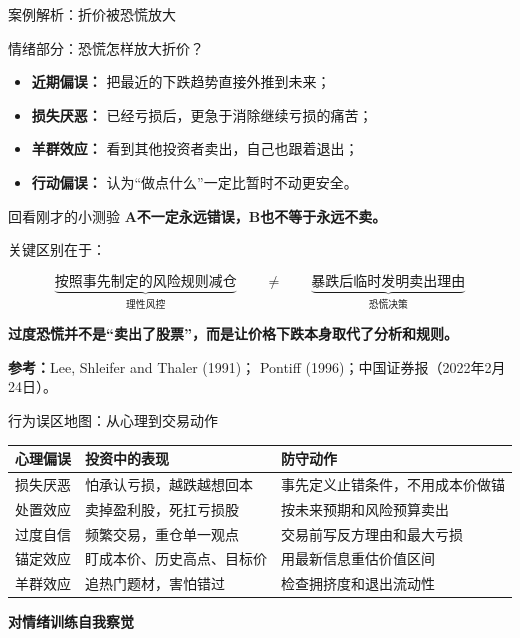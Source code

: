 \documentclass[UTF8,aspectratio=169,11pt]{ctexbeamer}
\newcommand{\source}[1]{\vfill{\scriptsize\color{aqgray}\textbf{参考：}#1}}
\begin{document}
\begin{frame}{案例解析：折价被恐慌放大}
\scriptsize



\begin{riskbox}{情绪部分：恐慌怎样放大折价？}
\begin{itemize}
\item \textbf{近期偏误：}
      把最近的下跌趋势直接外推到未来；
\item \textbf{损失厌恶：}
      已经亏损后，更急于消除继续亏损的痛苦；
\item \textbf{羊群效应：}
      看到其他投资者卖出，自己也跟着退出；
\item \textbf{行动偏误：}
      认为“做点什么”一定比暂时不动更安全。
\end{itemize}
\end{riskbox}


\vspace{0.10cm}

\begin{greenbox}{回看刚才的小测验}
\centering
\textbf{A不一定永远错误，B也不等于永远不卖。}

\vspace{0.05cm}

关键区别在于：

\[
\underbrace{\text{按照事先制定的风险规则减仓}}_{\text{理性风控}}
\qquad\neq\qquad
\underbrace{\text{暴跌后临时发明卖出理由}}_{\text{恐慌决策}}
\]
\end{greenbox}

\vspace{0.08cm}

\begin{center}
\large
\textbf{过度恐慌并不是“卖出了股票”，而是让价格下跌本身取代了分析和规则。}
\end{center}

\source{Lee, Shleifer and Thaler (1991)；
Pontiff (1996)；中国证券报（2022年2月24日）。}
\end{frame}

\begin{frame}{行为误区地图：从心理到交易动作}
\begin{tabularx}{\textwidth}{p{2.6cm}X X}
\toprule
\textbf{心理偏误} & \textbf{投资中的表现} & \textbf{防守动作} \\
\midrule
损失厌恶 & 怕承认亏损，越跌越想回本 & 事先定义止错条件，不用成本价做锚 \\
处置效应 & 卖掉盈利股，死扛亏损股 & 按未来预期和风险预算卖出 \\
过度自信 & 频繁交易，重仓单一观点 & 交易前写反方理由和最大亏损 \\
锚定效应 & 盯成本价、历史高点、目标价 & 用最新信息重估价值区间 \\
羊群效应 & 追热门题材，害怕错过 & 检查拥挤度和退出流动性 \\
\bottomrule
\end{tabularx}
\vspace{0.2cm}
\begin{center}\large \textbf{对情绪训练自我察觉}\end{center}
\end{frame}
\end{document}
